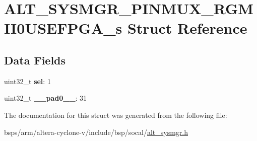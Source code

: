 \hypertarget{structALT__SYSMGR__PINMUX__RGMII0USEFPGA__s}{}\section{A\+L\+T\+\_\+\+S\+Y\+S\+M\+G\+R\+\_\+\+P\+I\+N\+M\+U\+X\+\_\+\+R\+G\+M\+I\+I0\+U\+S\+E\+F\+P\+G\+A\+\_\+s Struct Reference}
\label{structALT__SYSMGR__PINMUX__RGMII0USEFPGA__s}
\subsection*{Data Fields}
\begin{DoxyCompactItemize}
\item 
\mbox{\label{structALT__SYSMGR__PINMUX__RGMII0USEFPGA__s_aa9ac86f260b6a5d86b9e41b8a30bbd63}} 
uint32\+\_\+t {\bfseries sel}\+: 1
\item 
\mbox{\label{structALT__SYSMGR__PINMUX__RGMII0USEFPGA__s_a398397cffd80ea85ba2f801b153d2990}} 
uint32\+\_\+t {\bfseries \+\_\+\+\_\+pad0\+\_\+\+\_\+}\+: 31
\end{DoxyCompactItemize}


The documentation for this struct was generated from the following file\+:\begin{DoxyCompactItemize}
\item 
bsps/arm/altera-\/cyclone-\/v/include/bsp/socal/\mbox{\hyperlink{alt__sysmgr_8h}{alt\+\_\+sysmgr.\+h}}\end{DoxyCompactItemize}
